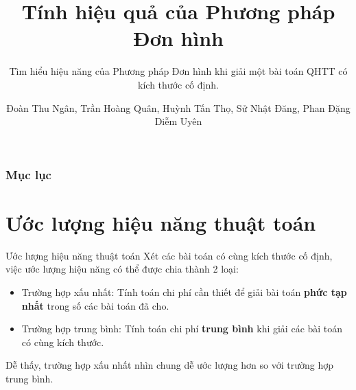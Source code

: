 \documentclass[10pt]{beamer}
\begin{document}
\author{Đoàn Thu Ngân, Trần Hoàng Quân, Huỳnh Tấn Thọ, Sử Nhật Đăng, Phan Đặng Diễm Uyên}
\title{Tính hiệu quả của Phương pháp Đơn hình}
\subtitle{Tìm hiểu hiệu năng của Phương pháp Đơn hình khi giải một bài toán QHTT có kích thước cố định.}
\subject{CSC10104 - Linear Programming}


\begin{frame}[plain]
\maketitle
\end{frame}

\begin{frame}
\frametitle{Mục lục}
\tableofcontents
\end{frame}

\section{Ước lượng hiệu năng thuật toán}
\begin{frame}{Ước lượng hiệu năng thuật toán}
Xét các bài toán có cùng kích thước cố định, việc ước lượng hiệu năng có thể được chia thành 2 loại:
\begin{itemize}
\item Trường hợp xấu nhất: Tính toán chi phí cần thiết để giải bài toán \textbf{phức tạp nhất} trong số các bài toán đã cho.
\item Trường hợp trung bình: Tính toán chi phí \textbf{trung bình} khi giải các bài toán có cùng kích thước.
\end{itemize}
Dễ thấy, trường hợp xấu nhất nhìn chung dễ ước lượng hơn so với trường hợp trung bình.
\end{frame}
\end{document}
